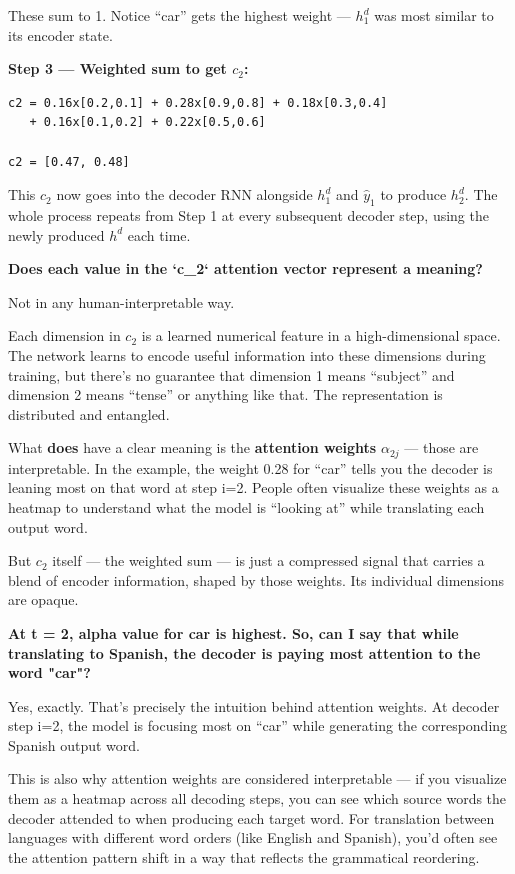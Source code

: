 These sum to 1. Notice ``car'' gets the highest weight --- $h_1^d$ was most similar to its encoder state.

\textbf{Step 3 --- Weighted sum to get $c_2$:}

\begin{verbatim}
c2 = 0.16x[0.2,0.1] + 0.28x[0.9,0.8] + 0.18x[0.3,0.4]
   + 0.16x[0.1,0.2] + 0.22x[0.5,0.6]

c2 = [0.47, 0.48]
\end{verbatim}

This $c_2$ now goes into the decoder RNN alongside $h_1^d$ and $\hat{y}_1$ to produce $h_2^d$. The whole process repeats from Step 1 at every subsequent decoder step, using the newly produced $h^d$ each time.

\bigskip

\textbf{Does each value in the `c\_2` attention vector represent a meaning?}

Not in any human-interpretable way.

Each dimension in $c_2$ is a learned numerical feature in a high-dimensional space. The network learns to encode useful information into these dimensions during training, but there's no guarantee that dimension 1 means ``subject'' and dimension 2 means ``tense'' or anything like that. The representation is distributed and entangled.

What \textbf{does} have a clear meaning is the \textbf{attention weights} $\alpha_{2j}$ --- those are interpretable. In the example, the weight 0.28 for ``car'' tells you the decoder is leaning most on that word at step i=2. People often visualize these weights as a heatmap to understand what the model is ``looking at'' while translating each output word.

But $c_2$ itself --- the weighted sum --- is just a compressed signal that carries a blend of encoder information, shaped by those weights. Its individual dimensions are opaque.

\bigskip

\textbf{At t = 2, alpha value for car is highest. So, can I say that while translating to Spanish, the decoder is paying most attention to the word "car"?}

Yes, exactly. That's precisely the intuition behind attention weights. At decoder step i=2, the model is focusing most on ``car'' while generating the corresponding Spanish output word.

This is also why attention weights are considered interpretable --- if you visualize them as a heatmap across all decoding steps, you can see which source words the decoder attended to when producing each target word. For translation between languages with different word orders (like English and Spanish), you'd often see the attention pattern shift in a way that reflects the grammatical reordering.

